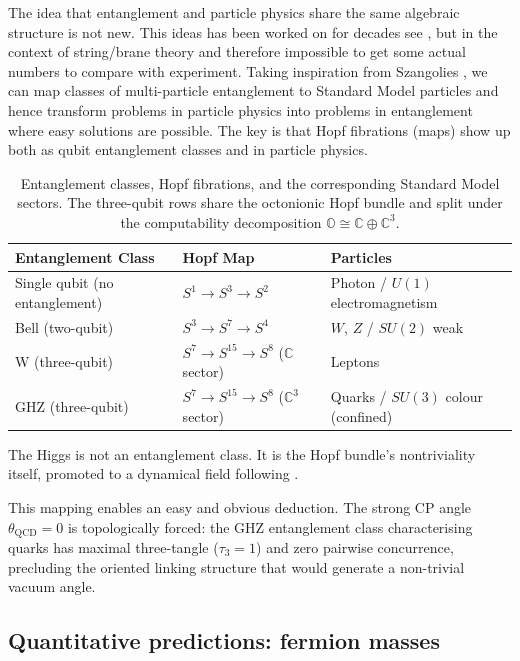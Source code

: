 \documentclass{article}
\begin{document}
The idea that entanglement and particle physics share the same algebraic structure is not new. This ideas has been worked on for decades see \autocite{borsten_2009}, but in the context of string/brane theory and therefore impossible to get some actual numbers to compare with experiment. Taking inspiration from Szangolies \autocite{szangolies_2025}, we can map classes of multi-particle entanglement to Standard Model particles and hence transform problems in particle physics into problems in entanglement where easy solutions are possible. The key is that Hopf fibrations (maps) show up both as qubit entanglement classes and in particle physics. 
  \begin{table}[h]
  \centering
  \begin{tabular}{@{}lll@{}}
    \toprule
    \textbf{Entanglement Class} & \textbf{Hopf Map} & \textbf{Particles} \\
    \midrule
    Single qubit (no entanglement) & $S^{1} \to S^{3} \to S^{2}$ & Photon / $U(1)$ electromagnetism \\
    Bell (two-qubit)               & $S^{3} \to S^{7} \to S^{4}$ & $W$, $Z$ / $SU(2)$ weak \\
    W (three-qubit)                & $S^{7} \to S^{15} \to S^{8}$ ($\mathbb{C}$ sector)   & Leptons \\
    GHZ (three-qubit)              & $S^{7} \to S^{15} \to S^{8}$ ($\mathbb{C}^{3}$ sector) & Quarks / $SU(3)$ colour (confined) \\
    \bottomrule
  \end{tabular}
  \caption{Entanglement classes, Hopf fibrations, and the corresponding Standard Model sectors. The three-qubit rows share the octonionic Hopf bundle and split under the computability decomposition $\mathbb{O} \cong \mathbb{C} \oplus \mathbb{C}^{3}$.}
  \label{tab:entanglement-hopf-particles} 
\end{table}
The Higgs is not an entanglement class. It is the Hopf bundle's nontriviality itself, promoted to a dynamical field following \autocite{szangolies_2025, finkelstein_1962, finkelstein_1963}.

This mapping enables an easy and obvious deduction. The strong CP angle $\theta_{\mathrm{QCD}} = 0$ is topologically forced: the GHZ entanglement class characterising quarks has maximal three-tangle ($\tau_3 = 1$) and zero pairwise concurrence, precluding the oriented linking structure that would generate a non-trivial vacuum angle.


\subsection{Quantitative predictions: fermion masses}
\end{document}
